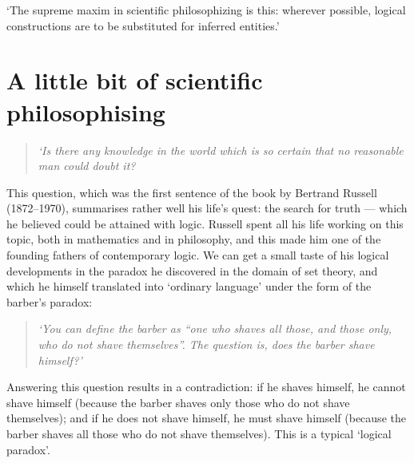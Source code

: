 \begin{savequote}[8cm]

	‘The supreme maxim in scientific philosophizing is this: wherever possible, logical constructions are to be substituted for inferred entities.’
	
	
\end{savequote}

\chapter{\label{ch:10-philosophising}A little bit of scientific philosophising}


\minitoc{}


\begin{quote}
	\textit{‘Is there any knowledge in the world which is so certain that no reasonable man could doubt it?}
\end{quote}

This question, which was the first sentence of the book \textit{} \citeyearpar{russell1912problems} by Bertrand Russell (1872--1970), summarises rather well his life's quest: the search for truth — which he believed could be attained with logic.
Russell spent all his life working on this topic, both in mathematics and in philosophy, and this made him one of the founding fathers of contemporary logic.
We can get a small taste of his logical developments in the paradox he discovered in the domain of set theory, and which he himself translated into ‘ordinary language’ \citep{russell1918philosophy} under the form of the barber's paradox:

\begin{quote}
	\textit{‘You can define the barber as “one who shaves all those, and those only, who do not shave themselves”. The question is, does the barber shave himself?’}
\end{quote}

Answering this question results in a contradiction: if he shaves himself, he cannot shave himself (because the barber shaves only those who do not shave themselves); and if he does not shave himself, he must shave himself (because the barber shaves all those who do not shave themselves). This is a typical ‘logical paradox’.

